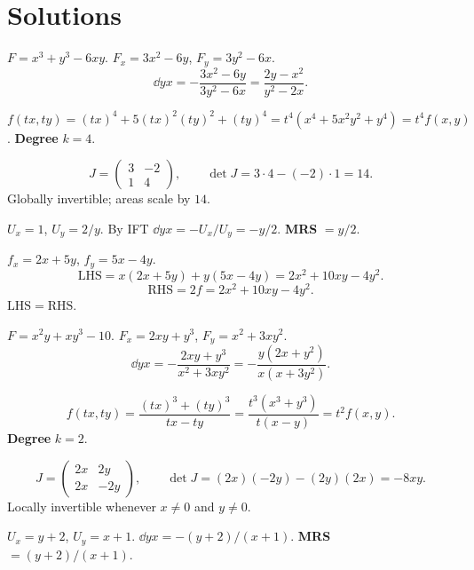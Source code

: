 \section{Solutions}

\begin{solutions}
  \item $F=x^{3}+y^{3}-6xy$. $F_{x}=3x^{2}-6y$, $F_{y}=3y^{2}-6x$.
        \[
          \dd{y}{x} = -\frac{3x^{2}-6y}{3y^{2}-6x} = \frac{2y-x^{2}}{y^{2}-2x} .
        \]

  \item $f(tx,ty)=(tx)^{4}+5(tx)^{2}(ty)^{2}+(ty)^{4}
        =t^{4}(x^{4}+5x^{2}y^{2}+y^{4})=t^{4}f(x,y)$. \textbf{Degree}
        $k=4$.

  \item
        \[
          J=\begin{pmatrix} 3 & -2\\ 1 & 4\end{pmatrix},\qquad
          \det J=3\cdot 4-(-2)\cdot 1=14 .
        \]
        Globally invertible; areas scale by $14$.

  \item $U_{x}=1$, $U_{y}=2/y$. By IFT $\dd{y}{x}=-U_{x}/U_{y}=-y/2$.
        \textbf{MRS} $=y/2$.

  \item $f_{x}=2x+5y$, $f_{y}=5x-4y$.
        \[
          \mathrm{LHS}=x(2x+5y)+y(5x-4y)=2x^{2}+10xy-4y^{2} .
        \]
        \[
          \mathrm{RHS}=2f=2x^{2}+10xy-4y^{2} .
        \]
        $\mathrm{LHS}=\mathrm{RHS}$. \checkmark

  \item $F=x^{2}y+xy^{3}-10$. $F_{x}=2xy+y^{3}$, $F_{y}=x^{2}+3xy^{2}$.
        \[
          \dd{y}{x} = -\frac{2xy+y^{3}}{x^{2}+3xy^{2}}
            = -\frac{y(2x+y^{2})}{x(x+3y^{2})} .
        \]

  \item
        \[
          f(tx,ty)=\frac{(tx)^{3}+(ty)^{3}}{tx-ty}
            =\frac{t^{3}(x^{3}+y^{3})}{t(x-y)}=t^{2}f(x,y) .
        \]
        \textbf{Degree} $k=2$.

  \item
        \[
          J=\begin{pmatrix} 2x & 2y\\ 2x & -2y\end{pmatrix},\qquad
          \det J=(2x)(-2y)-(2y)(2x)=-8xy .
        \]
        Locally invertible whenever $x\neq 0$ and $y\neq 0$.

  \item $U_{x}=y+2$, $U_{y}=x+1$. $\dd{y}{x}=-(y+2)/(x+1)$.
        \textbf{MRS} $=(y+2)/(x+1)$.


\end{solutions}
